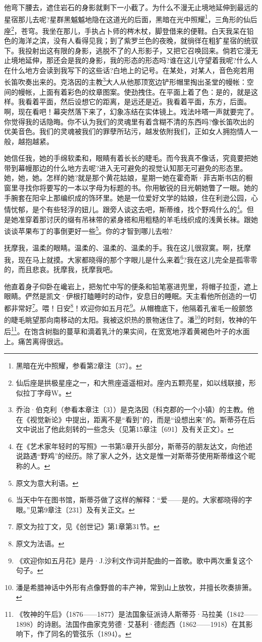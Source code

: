 \par 他弯下腰去，遮住岩石的身影就剩下一小截了。为什么不漫无止境地延伸到最远的星宿那儿去呢?星群黑魆魆地隐在这道光的后面，黑暗在光中照耀\footnote{黑暗在光中照耀，参看第2章注〔37〕。}，三角形的仙后座\footnote{仙后座是拱极星座之一，和大熊座遥遥相对。座内五颗亮星，如以线联接，形似拉丁字母W。}，苍穹。我坐在那儿，手执占卜师的梣木杖，脚登借来的便鞋。白天我呆在铅色的海洋之滨，没有人看得见我；到了紫罗兰色的夜晚，就徜徉在粗犷星宿的统驭下。我投射出这有限的身影，逃脱不了的人形影子，又把它召唤回来。倘若它漫无止境地延伸，那还会是我的身影，我的形态的形态吗?谁在这儿守望着我呢?什么人在什么地方会读到我写下的这些话?白地上的记号。在某处，对某人，音色宛若用长笛吹奏出来的。克洛因的主教\footnote{乔治·伯克利（参看本章注〔3〕）是克洛因（科克郡的一个小镇）的主教。他在《视觉新论》中提出，距离不是“看到”的，而是“设想出来”的。斯蒂芬在后文中说出了他此刻转的一些念头（见第15章注〔691〕及有关正文）。}大人从他那顶宽边铲形帽里掏出圣堂的幔帐：空间的幔帐，上面有着彩色的纹章图案。使劲拽住。在平面上着了色：是的，就是这样。我看着平面，然后设想它的距离，是远还是近。我看着平面，东方，后面。啊，现在看吧！幕突然落下来了，幻象冻结在实体镜上。戏法咔嗒一声就要完了。你觉得我的话隐晦。你不认为我们的灵魂里有着含糊不清的东西吗?像长笛吹出的优美音色。我们的灵魂被我们的罪孽所玷污，越发依附我们，正如女人拥抱情人一般，越抱越紧。
\par 她信任我，她的手绵软柔和，眼睛有着长长的睫毛。而今我真不像话，究竟要把她带到幕幔那边的什么地方去呢?进入无可避免的视觉认知那无可避免的形态里。她，她，她。怎样的她?就是那个黄花姑娘，星期一她在霍奇斯·菲吉斯书店的橱窗里寻找你将要写的一本以字母为标题的书。你用敏锐的目光朝她瞥了一眼。她的手腕套在阳伞上那编织成的饰环里。她是一位爱好文学的姑娘，住在利逊公园，心情忧郁，是个有些轻浮的妞儿。跟旁人谈这去吧，斯蒂维，找个野鸡什么的\footnote{在《艺术家年轻时的写照》一书第5章开头部分，斯蒂芬的朋友达文，向他述说路遇“野鸡”的经历。除了家人之外，达文是惟一对斯蒂芬使用斯蒂维这个昵称的人。}。但是她准穿着那讨厌的缀有吊袜带的紧身褡和用粗糙的羊毛线织成的浅黄长袜。跟她谈谈苹果布丁的事倒更好一些\footnote{原文为意大利语。}。你的才智到哪儿去啦?
\par 抚摩我，温柔的眼睛。温柔的、温柔的、温柔的手。我在这儿很寂寞。啊，抚摩我，现在马上就摸。大家都晓得的那个字眼儿是什么来着\footnote{当天中午在图书馆，斯蒂芬做了这样的解释：“爱——是的。大家都晓得的字眼。”见第9章注〔231〕及有关正文。}?我在这儿完全是孤零零的，而且悲哀。抚摩我，抚摩我吧。
\par 他直着身子仰卧在巉岩上，把匆忙中写的便条和铅笔塞进兜里，将帽子拉歪，遮上眼睛。俨然是凯文·伊根打瞌睡时的动作，安息日的睡眠。天主看他所创造的一切都非常好\footnote{原文为拉丁文，见《创世记》第1章第31节。}。喂！日安\footnote{原文为法语。}！欢迎你如五月花\footnote{《欢迎你如五月花》是丹·J.沙利文作词并配曲的一首歌。歌中两次重复这个句子。}。从帽檐底下，他隔着孔雀毛一般颤悠的睫毛眺望那向南移动的太阳。我被这炽热的景物迷住了。潘\footnote{潘是希腊神话中外形有点像野兽的丰产神，常到山上放牧，并擅长吹奏排箫。}的时刻，牧神的午后\footnote{《牧神的午后》（1876——1877）是法国象征派诗人斯蒂芬·马拉美（1842——1898）的诗剧。法国作曲家克劳德·艾基利·德彪西（1862——1918）在其影响下，作了同名的管弦乐（1894）。}。在饱含树脂的蔓草和滴着乳汁的果实间，在宽宽地浮着黄褐色叶子的水面上。痛苦离得很远。

